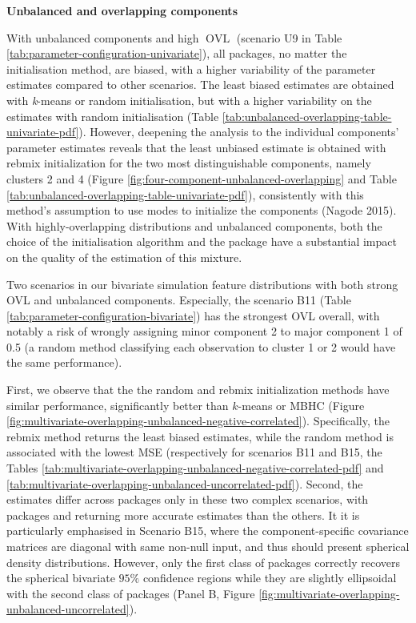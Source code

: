 \textbf{Unbalanced and overlapping components}

With unbalanced components and high \(\operatorname{OVL}\) (scenario U9 in Table
\ref{tab:parameter-configuration-univariate}), all packages, no
matter the initialisation method, are biased, with a higher variability
of the parameter estimates compared to other scenarios. The least biased
estimates are obtained with \emph{k}-means or random initialisation, but with
a higher variability on the estimates with random initialisation (Table
\ref{tab:unbalanced-overlapping-table-univariate-pdf}).
However, deepening the analysis to the individual components' parameter estimates
reveals that the least unbiased estimate is obtained with rebmix initialization
for the two most distinguishable components, namely clusters 2 and 4 (Figure \ref{fig:four-component-unbalanced-overlapping} and
Table
\ref{tab:unbalanced-overlapping-table-univariate-pdf}), consistently with this method's assumption to use modes to initialize the components (Nagode 2015). With highly-overlapping distributions and unbalanced components, both the choice of the initialisation algorithm and the package have a
substantial impact on the quality of the estimation of this mixture.

Two scenarios in our bivariate simulation feature distributions with both strong OVL and unbalanced components. Especially, the scenario B11 (Table \ref{tab:parameter-configuration-bivariate}) has the strongest OVL overall, with notably a risk of wrongly assigning minor component 2 to major component 1 of 0.5 (a random method classifying each observation to cluster 1 or 2 would have the same performance).

First, we observe that the the random and rebmix initialization methods have similar performance, significantly better than \(k\)-means or MBHC (Figure \ref{fig:multivariate-overlapping-unbalanced-negative-correlated}). Specifically, the rebmix method returns the least biased estimates, while the random method is associated with the lowest MSE (respectively for scenarios B11 and B15, the Tables \ref{tab:multivariate-overlapping-unbalanced-negative-correlated-pdf}
and \ref{tab:multivariate-overlapping-unbalanced-uncorrelated-pdf}). Second, the estimates differ across packages only in these two complex scenarios, with packages  and  returning more accurate estimates than the others.
It it is particularly emphasised in Scenario B15, where the component-specific covariance matrices are diagonal with same non-null input, and thus should present spherical density distributions. However, only the first class of packages correctly recovers the spherical bivariate \(95\%\) confidence regions while they are slightly ellipsoidal with the second class of packages (Panel B, Figure \ref{fig:multivariate-overlapping-unbalanced-uncorrelated}).

